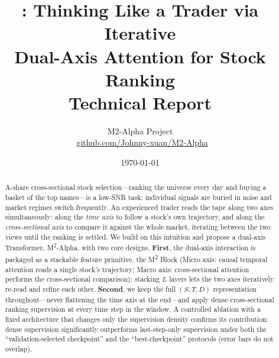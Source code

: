 \documentclass[a4paper,11pt]{article}
\title{\bfseries \msqa: Thinking Like a Trader via Iterative\\
       Dual-Axis Attention for Stock Ranking\\[4pt]\large Technical Report}
\author{M2-Alpha Project\\[3pt]
{\normalsize\faGithub~\href{https://github.com/Johnny-xuan/M2-Alpha}{github.com/Johnny-xuan/M2-Alpha}}}
\date{\today}
\newcommand{\msq}{\texorpdfstring{M\textsuperscript{2}}{M2}}             %
\newcommand{\msqa}{\texorpdfstring{M\textsuperscript{2}-Alpha}{M2-Alpha}} %
\begin{document}
\maketitle

\begin{abstract}
\noindent
A-share cross-sectional stock selection---ranking the universe every day and
buying a basket of the top names---is a low-SNR task: individual signals are
buried in noise and market regimes switch frequently. An experienced trader
reads the tape along two axes simultaneously: along the \emph{time axis} to
follow a stock's own trajectory, and along the \emph{cross-sectional axis} to
compare it against the whole market, iterating between the two views until the
ranking is settled. We build on this intuition and propose a dual-axis
Transformer, \msqa{}, with two core designs. \textbf{First}, the dual-axis
interaction is packaged as a stackable feature primitive, the \msq{} Block
(Micro axis: causal temporal attention reads a single stock's trajectory; Macro
axis: cross-sectional attention performs the cross-sectional comparison); stacking $L$
layers lets the two axes iteratively re-read and refine each other.
\textbf{Second}, we keep the full $(S,T,D)$ representation throughout---never
flattening the time axis at the end---and apply dense cross-sectional ranking
supervision at every time step in the window. A controlled ablation with a
fixed architecture that changes only the supervision density confirms its
contribution: dense supervision significantly outperforms last-step-only
supervision under both the ``validation-selected checkpoint'' and the
``best-checkpoint'' protocols (error bars do not overlap).


\end{abstract}
\end{document}
